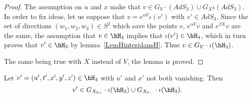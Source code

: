 \begin{proof}
The assumption on $u$ and $x$ make that $v\in G_V\cdot(AdS_3)\cup G_X\iota(AdS_3)$. In order to fix ideas, let us suppose that $v= e^{\alpha V}\iota(v')$ with $v'\in AdS_3$. Since the set of directions $(w_1,w_2,w_3)\in S^2$ which save the points $v$, $ e^{\alpha V}v$ and $ e^{\beta X}v$ are the same, the assumption that $v\in\hH_4$ implies that $\iota(v')\in \hH_4$, which in turn proves that $v'\in \hH_3$ by lemma~\ref{LemHinteridansH}. Thus $v\in G_V\cdot\iota(\hH_3)$.

The same being true with $X$ instead of $V$, the lemma is proved.
\end{proof}

\begin{proposition}		\label{PropovHhnonXYzero}
	Let $v'=(u',t',x',y',z')\in\hH_4$ with $u'$ and $x'$ not both vanishing. Then
	\begin{equation}
		v'\in G_{X_{0+}}\cdot \iota(\hH_3)\cup G_{X_{0-}}\cdot \iota(\hH_3).
	\end{equation}
\end{proposition}

